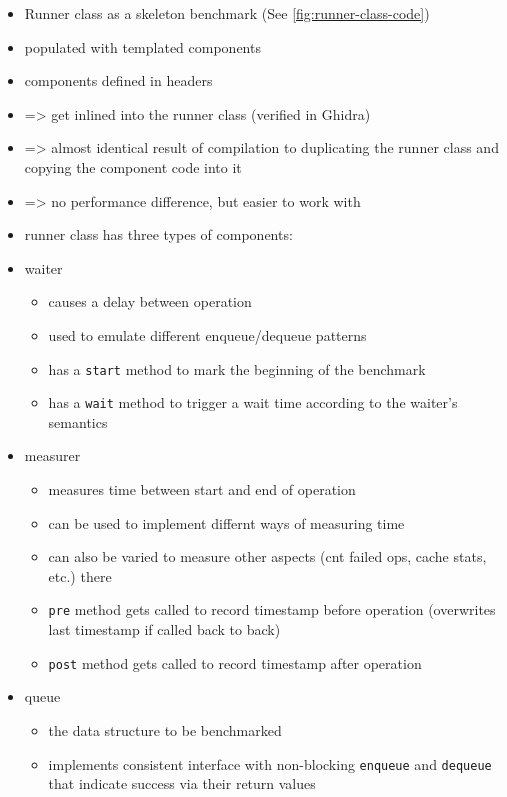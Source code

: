 \begin{itemize}
    \item Runner class as a skeleton benchmark (See \autoref{fig:runner-class-code})
    \item populated with templated components
    \item components defined in headers
    \item => get inlined into the runner class (verified in Ghidra)
    \item => almost identical result of compilation to duplicating the runner class and copying the component
        code into it
    \item => no performance difference, but easier to work with
    \item runner class has three types of components:
    \item waiter
        \begin{itemize}
            \item causes a delay between operation
            \item used to emulate different enqueue/dequeue patterns
            \item has a \texttt{start} method to mark the beginning of the benchmark
            \item has a \texttt{wait} method to trigger a wait time according to the waiter's semantics
        \end{itemize}
    \item measurer
        \begin{itemize}
            \item measures time between start and end of operation
            \item can be used to implement differnt ways of measuring time
            \item can also be varied to measure other aspects (cnt failed ops, cache stats, etc.) there
            \item \texttt{pre} method gets called to record timestamp before operation (overwrites last
                timestamp if called back to back)
            \item \texttt{post} method gets called to record timestamp after operation
        \end{itemize}
    \item queue
        \begin{itemize}
            \item the data structure to be benchmarked
            \item implements consistent interface with non-blocking \texttt{enqueue} and \texttt{dequeue}
                that indicate success via their return values
        \end{itemize}
\end{itemize}

